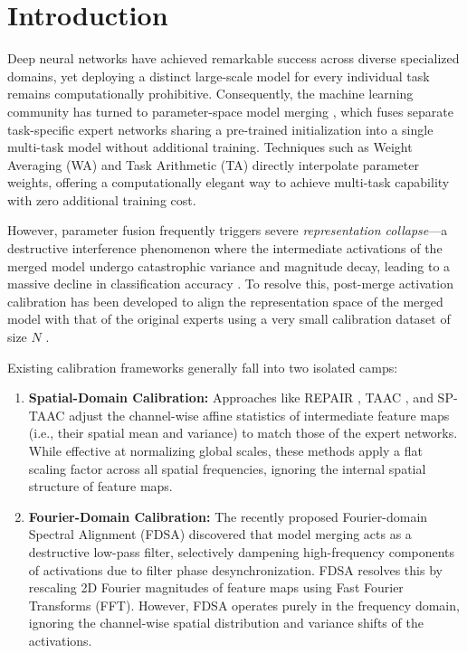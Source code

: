 \documentclass{article}
\theoremstyle{plain}
\theoremstyle{definition}
\theoremstyle{remark}
\begin{document}
\section{Introduction}
\label{sec:intro}
Deep neural networks have achieved remarkable success across diverse specialized domains, yet deploying a distinct large-scale model for every individual task remains computationally prohibitive. Consequently, the machine learning community has turned to parameter-space model merging \cite{choshen2022fusing,wortsman2022model}, which fuses separate task-specific expert networks sharing a pre-trained initialization into a single multi-task model without additional training. Techniques such as Weight Averaging (WA) \cite{izmailov2018averaging} and Task Arithmetic (TA) \cite{ilharco2022editing} directly interpolate parameter weights, offering a computationally elegant way to achieve multi-task capability with zero additional training cost.

However, parameter fusion frequently triggers severe \textit{representation collapse}—a destructive interference phenomenon where the intermediate activations of the merged model undergo catastrophic variance and magnitude decay, leading to a massive decline in classification accuracy \cite{jordan2022repair,yadav2023ties}. To resolve this, post-merge activation calibration has been developed to align the representation space of the merged model with that of the original experts using a very small calibration dataset of size $N$ \cite{srac2026,ziocf2026}.

Existing calibration frameworks generally fall into two isolated camps:
\begin{enumerate}
    \item \textbf{Spatial-Domain Calibration:} Approaches like REPAIR \cite{jordan2022repair}, TAAC \cite{srac2026}, and SP-TAAC \cite{sptaac2026} adjust the channel-wise affine statistics of intermediate feature maps (i.e., their spatial mean and variance) to match those of the expert networks. While effective at normalizing global scales, these methods apply a flat scaling factor across all spatial frequencies, ignoring the internal spatial structure of feature maps.
    \item \textbf{Fourier-Domain Calibration:} The recently proposed Fourier-domain Spectral Alignment (FDSA) \cite{fdsa2026} discovered that model merging acts as a destructive low-pass filter, selectively dampening high-frequency components of activations due to filter phase desynchronization. FDSA resolves this by rescaling 2D Fourier magnitudes of feature maps using Fast Fourier Transforms (FFT). However, FDSA operates purely in the frequency domain, ignoring the channel-wise spatial distribution and variance shifts of the activations.
\end{enumerate}
\end{document}
